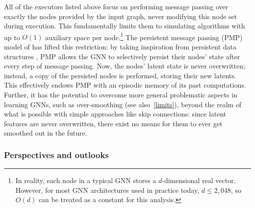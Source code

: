 \documentclass[twoside,11pt]{article}
\newcommand{\cm}[1]{{{\textcolor{orange}{\textbf{[CM:} {#1}\textbf{]}}}}}
\begin{document}
All of the executors listed above focus on performing message passing over exactly the nodes provided by the input graph, never modifying this node set during execution. This fundamentally limits them to simulating algorithms with up to $O(1)$ auxiliary space per node.\footnote{In reality, each node in a typical GNN stores a $d$-dimensional real vector. However, for most GNN architectures used in practice today, $d\leq 2,048$, so $O(d)$ can be treated as a constant for this analysis.} The persistent message passing (PMP) model of \citet{strathmann2021persistent} has lifted this restriction: by taking inspiration from persistent data structures \citep{driscoll1989making}, PMP allows the GNN to selectively {persist} their nodes' state after every step of message passing. Now, the nodes' latent state is never overwritten; instead, a {copy} of the persisted nodes is performed, storing their new latents. This effectively endows PMP with an episodic memory \citep{Pritzel2017} of its past computations. Further, it has the potential to overcome more general problematic aspects in learning GNNs, such as over-smoothing (see also~\cref{limits}), beyond the realm of what is possible with simple approaches like skip connections: since latent features are never overwritten, there exist no means for them to ever get smoothed out in the future.

\subsubsection{Perspectives and outlooks}

\end{document}
